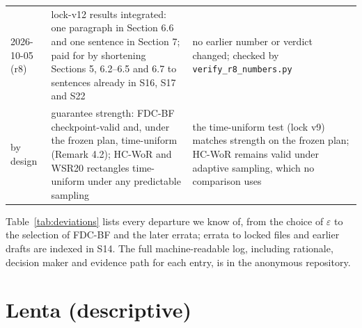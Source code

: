 \documentclass[sigconf,anonymous,review]{acmart}
\newcommand{\eps}{\varepsilon}
\begin{document}
\begin{table}[t]
\begin{tabular}{@{}l>{\raggedright\arraybackslash}p{6.6cm}>{\raggedright\arraybackslash}p{7.6cm}@{}}
2026-10-05 (r8) & lock-v12 results integrated: one paragraph in Section 6.6 and one sentence in Section 7; paid for by shortening Sections 5, 6.2--6.5 and 6.7 to sentences already in S16, S17 and S22 & no earlier number or verdict changed; checked by \texttt{verify\_r8\_numbers.py} \\
by design & guarantee strength: FDC-BF checkpoint-valid and, under the frozen plan, time-uniform (Remark 4.2); HC-WoR and WSR20 rectangles time-uniform under any predictable sampling & the time-uniform test (lock v9) matches strength on the frozen plan; HC-WoR remains valid under adaptive sampling, which no comparison uses \\
\bottomrule
\end{tabular}
\end{table}

Table~\ref{tab:deviations} lists every departure we know of, from the choice of $\eps$ to the selection of FDC-BF and the later errata; errata to locked files and earlier drafts are indexed in S14. The full machine-readable log, including rationale, decision maker and evidence path for each entry, is in the anonymous repository.

\section{Lenta (descriptive)}\label{app:lenta}
\end{document}
